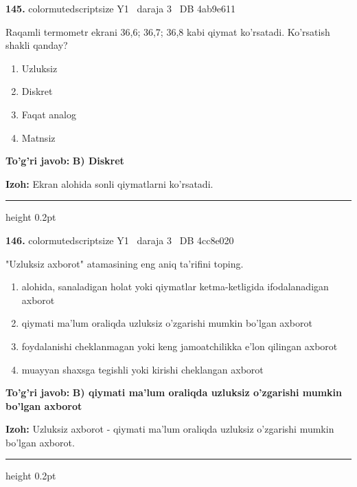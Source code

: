 \documentclass[10pt,a4paper,oneside]{article}
\begin{document}
\noindent\textbf{\color{ink}145.}  {color{muted}scriptsize Y1 \textbullet\ daraja 3 \textbullet\ DB 4ab9e611}
\par
Raqamli termometr ekrani 36,6; 36,7; 36,8 kabi qiymat ko'rsatadi. Ko'rsatish shakli qanday?
\begin{enumerate}[label=\Alph*),leftmargin=9mm]
\item Uzluksiz
\item Diskret
\item Faqat analog
\item Matnsiz
\end{enumerate}
\begin{tcolorbox}[enhanced,breakable,colback=teal!4,colframe=teal!50!black,boxrule=0.5pt,arc=1.1mm,left=3mm,right=3mm,top=1.7mm,bottom=1.7mm,before skip=2mm,after skip=2mm]
\textbf{\color{teal}To'g'ri javob:} \textbf{B) Diskret}
\par\smallskip
\textbf{Izoh:} Ekran alohida sonli qiymatlarni ko'rsatadi.
\end{tcolorbox}
\vspace{2mm}\hrule height 0.2pt \vspace{3mm}

\noindent\textbf{\color{ink}146.}  {color{muted}scriptsize Y1 \textbullet\ daraja 3 \textbullet\ DB 4cc8e020}
\par
"Uzluksiz axborot" atamasining eng aniq ta'rifini toping.
\begin{enumerate}[label=\Alph*),leftmargin=9mm]
\item alohida, sanaladigan holat yoki qiymatlar ketma-ketligida ifodalanadigan axborot
\item qiymati ma'lum oraliqda uzluksiz o'zgarishi mumkin bo'lgan axborot
\item foydalanishi cheklanmagan yoki keng jamoatchilikka e'lon qilingan axborot
\item muayyan shaxsga tegishli yoki kirishi cheklangan axborot
\end{enumerate}
\begin{tcolorbox}[enhanced,breakable,colback=teal!4,colframe=teal!50!black,boxrule=0.5pt,arc=1.1mm,left=3mm,right=3mm,top=1.7mm,bottom=1.7mm,before skip=2mm,after skip=2mm]
\textbf{\color{teal}To'g'ri javob:} \textbf{B) qiymati ma'lum oraliqda uzluksiz o'zgarishi mumkin bo'lgan axborot}
\par\smallskip
\textbf{Izoh:} Uzluksiz axborot - qiymati ma'lum oraliqda uzluksiz o'zgarishi mumkin bo'lgan axborot.
\end{tcolorbox}
\vspace{2mm}\hrule height 0.2pt \vspace{3mm}
\end{document}
